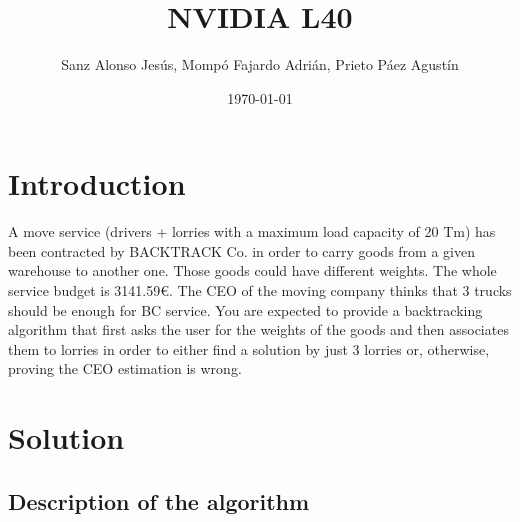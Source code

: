 \documentclass{article}
\title{NVIDIA L40}
\author{Sanz Alonso Jesús, Mompó Fajardo Adrián, Prieto Páez Agustín}
\date{\today}
\begin{document}
\pagestyle{fancy}
\fancyfoot[C]{\thepage}
\maketitle
\tableofcontents

\section{Introduction}
A move service (drivers + lorries with a maximum load capacity of 20 Tm) has been contracted
by BACKTRACK Co. in order to carry goods from a given warehouse to another one. Those
goods could have different weights. The whole service budget is 3141.59€. The CEO of the
moving company thinks that 3 trucks should be enough for BC service. You are expected to
provide a backtracking algorithm that first asks the user for the weights of the goods and then
associates them to lorries in order to either find a solution by just 3 lorries or, otherwise,
proving the CEO estimation is wrong.


\section{Solution}
\subsection{Description of the algorithm}
\end{document}
